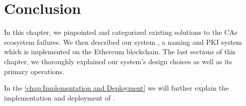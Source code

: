 \section{Conclusion}

In this chapter, we pinpointed and categorized existing solutions to the CAs ecosystem failures. We then described our system \Ghazalstar, a naming and PKI \UA system which is implemented on the Ethereum blockchain. The last sections of this chapter, we thoroughly explained our system's design choices as well as its primary operations.

In the \autoref{chap:Implementation and Deployment} we will further explain the implementation and deployment of \Ghazalstar.


